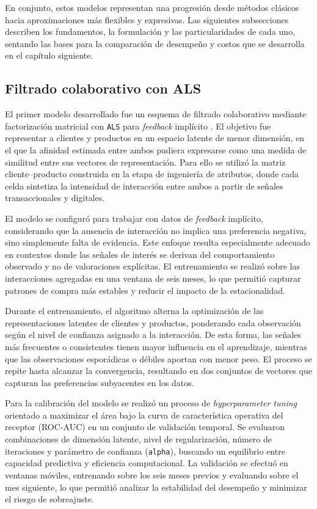 En conjunto, estos modelos representan una progresión desde métodos clásicos hacia aproximaciones más flexibles y expresivas. Las siguientes subsecciones describen los fundamentos, la formulación y las particularidades de cada uno, sentando las bases para la comparación de desempeño y costos que se desarrolla en el capítulo siguiente.

\subsection{Filtrado colaborativo con ALS}

El primer modelo desarrollado fue un esquema de filtrado colaborativo mediante factorización matricial con \texttt{ALS} para \textit{feedback} implícito \cite{ARTICLE:ALS2008}. El objetivo fue representar a clientes y productos en un espacio latente de menor dimensión, en el que la afinidad estimada entre ambos pudiera expresarse como una medida de similitud entre sus vectores de representación. Para ello se utilizó la matriz cliente–producto construida en la etapa de ingeniería de atributos, donde cada celda sintetiza la intensidad de interacción entre ambos a partir de señales transaccionales y digitales.

El modelo se configuró para trabajar con datos de \textit{feedback} implícito, considerando que la ausencia de interacción no implica una preferencia negativa, sino simplemente falta de evidencia. Este enfoque resulta especialmente adecuado en contextos donde las señales de interés se derivan del comportamiento observado y no de valoraciones explícitas. El entrenamiento se realizó sobre las interacciones agregadas en una ventana de seis meses, lo que permitió capturar patrones de compra más estables y reducir el impacto de la estacionalidad.

Durante el entrenamiento, el algoritmo alterna la optimización de las representaciones latentes de clientes y productos, ponderando cada observación según el nivel de confianza asignado a la interacción. De esta forma, las señales más frecuentes o consistentes tienen mayor influencia en el aprendizaje, mientras que las observaciones esporádicas o débiles aportan con menor peso. El proceso se repite hasta alcanzar la convergencia, resultando en dos conjuntos de vectores que capturan las preferencias subyacentes en los datos.

Para la calibración del modelo se realizó un proceso de \textit{hyperparameter tuning} orientado a maximizar el área bajo la curva de característica operativa del receptor (ROC-AUC) en un conjunto de validación temporal. Se evaluaron combinaciones de dimensión latente, nivel de regularización, número de iteraciones y parámetro de confianza (\texttt{alpha}), buscando un equilibrio entre capacidad predictiva y eficiencia computacional. La validación se efectuó en ventanas móviles, entrenando sobre los seis meses previos y evaluando sobre el mes siguiente, lo que permitió analizar la estabilidad del desempeño y minimizar el riesgo de sobreajuste.

